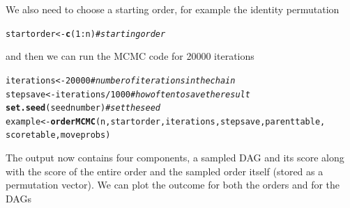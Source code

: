 \documentclass[a4paper]{article}\usepackage[]{graphicx}\usepackage[]{color}
\makeatletter
\newcommand{\hlnum}[1]{\textcolor[rgb]{0.686,0.059,0.569}{#1}}%
\newcommand{\hlcom}[1]{\textcolor[rgb]{0.678,0.584,0.686}{\textit{#1}}}%
\newcommand{\hlopt}[1]{\textcolor[rgb]{0,0,0}{#1}}%
\newcommand{\hlstd}[1]{\textcolor[rgb]{0.345,0.345,0.345}{#1}}%
\newcommand{\hlkwb}[1]{\textcolor[rgb]{0.69,0.353,0.396}{#1}}%
\newcommand{\hlkwd}[1]{\textcolor[rgb]{0.737,0.353,0.396}{\textbf{#1}}}%
\newenvironment{kframe}{%
 \def\at@end@of@kframe{}%
 \ifinner\ifhmode%
  \def\at@end@of@kframe{\end{minipage}}%
  \begin{minipage}{\columnwidth}%
 \fi\fi%
 \def\FrameCommand##1{\hskip\@totalleftmargin \hskip-\fboxsep
 \colorbox{shadecolor}{##1}\hskip-\fboxsep
     \hskip-\linewidth \hskip-\@totalleftmargin \hskip\columnwidth}%
 \MakeFramed {\advance\hsize-\width
   \@totalleftmargin\z@ \linewidth\hsize
   \@setminipage}}%
 {\par\unskip\endMakeFramed%
 \at@end@of@kframe}
\newenvironment{knitrout}{}{} %
\newcommand{\nn}{\noindent}
\makeatother
\begin{document}
\nn We also need to choose a starting order, for example the identity permutation

\begin{knitrout}
\color{fgcolor}\begin{kframe}
\begin{alltt}
\hlstd{startorder} \hlkwb{<-} \hlkwd{c}\hlstd{(}\hlnum{1}\hlopt{:}\hlstd{n)}  \hlcom{# starting order}
\end{alltt}
\end{kframe}
\end{knitrout}

\nn and then we can run the MCMC code for 20000 iterations

\begin{knitrout}
\color{fgcolor}\begin{kframe}
\begin{alltt}
\hlstd{iterations} \hlkwb{<-} \hlnum{20000}  \hlcom{#number of iterations in the chain}
\hlstd{stepsave} \hlkwb{<-} \hlstd{iterations}\hlopt{/}\hlnum{1000}  \hlcom{#how often to save the result}
\hlkwd{set.seed}\hlstd{(seednumber)}  \hlcom{# set the seed}
\hlstd{example} \hlkwb{<-} \hlkwd{orderMCMC}\hlstd{(n, startorder, iterations, stepsave, parenttable,}
    \hlstd{scoretable, moveprobs)}
\end{alltt}
\end{kframe}
\end{knitrout}

\nn The output now contains four components, a sampled DAG and its score along with the score of the entire order and the sampled order itself (stored as a permutation vector).  We can plot the outcome for both the orders and for the DAGs
\end{document}
